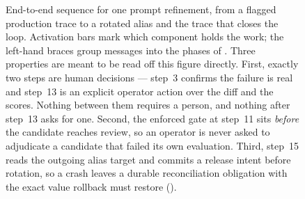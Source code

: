 \begin{figure}[tbp]
\begin{cbwide}
\begin{tikzpicture}[x=1cm,y=1cm]
\end{tikzpicture}
\end{cbwide}
\caption{End-to-end sequence for one prompt refinement, from a flagged production
trace to a rotated alias and the trace that closes the loop. Activation bars mark
which component holds the work; the left-hand braces group messages into the
phases of . Three properties are meant to be read off this
figure directly. First, exactly two steps are human decisions --- step~3 confirms
the failure is real and step~13 is an explicit operator action over the diff and
the scores. Nothing between them requires a person, and nothing after step~13
asks for one. Second, the enforced gate at step~11 sits \emph{before} the
candidate reaches review, so an operator is never asked to adjudicate a candidate
that failed its own evaluation. Third, step~15 reads the outgoing alias target and
commits a release intent before rotation, so a crash leaves a durable reconciliation
obligation with the exact value rollback must restore ().}
\label{fig:sequence}
\figkey
\end{figure}
